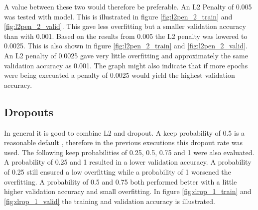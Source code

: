 

A value between these two  would therefore be preferable. An L2 Penalty of 0.005 was tested with model. This is illustrated in figure \ref{fig:l2pen_2_train} and \ref{fig:l2pen_2_valid}. This gave less overfitting but a smaller validation accuracy than with 0.001. Based on the results from 0.005 the L2 penalty was lowered to 0.0025. This is also shown in figure \ref{fig:l2pen_2_train} and \ref{fig:l2pen_2_valid}. An L2 penalty of 0.0025 gave very little overfitting and approximately the same validation accuracy as 0.001. The graph might also indicate that if more epochs were being execuated a penalty of 0.0025 would yield the highest validation accuracy.



\FloatBarrier
\subsection{Dropouts}
In general it is good to combine L2 and dropout. A keep probability of 0.5 is a reasonable default \citep{NN2}, therefore in the previous executions this dropout rate was used. The following keep probabilities of 0.25, 0.5, 0.75 and 1 were also evaluated. A probability of 0.25 and 1 resulted in a lower validation accuracy. A probability of 0.25 still ensured a low overfitting while a probability of 1 worsened the overfitting. A probability of 0.5 and 0.75 both performed better with a little higher validation accuracy and small overfitting. In figure \ref{fig:drop_1_train} and \ref{fig:drop_1_valid} the training and validation accuracy is illustrated.


